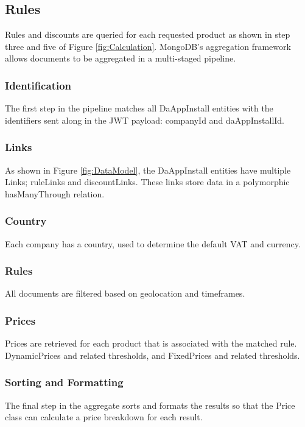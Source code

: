 \subsection{Rules}
Rules and discounts are queried for each requested product as shown in step three and five of Figure \ref{fig:Calculation}. MongoDB’s aggregation framework allows documents to be aggregated in a multi-staged pipeline.

\subsubsection{Identification}
The first step in the pipeline matches all DaAppInstall entities with the identifiers sent along in the JWT payload: companyId and daAppInstallId.
\subsubsection{Links}
As shown in Figure \ref{fig:DataModel}, the DaAppInstall entities have multiple Links; ruleLinks and discountLinks. These links store data in a polymorphic hasManyThrough relation.
\subsubsection{Country}
Each company has a country, used to determine the default VAT and currency.
\subsubsection{Rules}
All documents are filtered based on geolocation and timeframes.
\subsubsection{Prices}
Prices are retrieved for each product that is associated with the matched rule. DynamicPrices and related thresholds, and FixedPrices and related thresholds.
\subsubsection{Sorting and Formatting}
The final step in the aggregate sorts and formats the results so that the Price class can calculate a price breakdown for each result.


